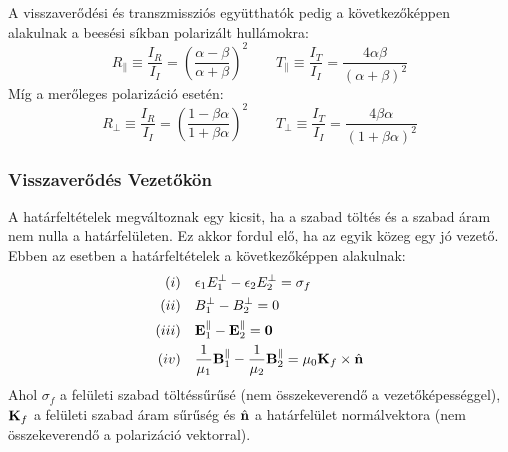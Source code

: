 \documentclass[a4paper,12pt]{article}
\begin{document}
A visszaverődési és transzmissziós együtthatók pedig a következőképpen alakulnak a beesési síkban polarizált hullámokra:
\begin{equation}
    R_\parallel \equiv \frac{I_R}{I_I} = \left( \frac{\alpha - \beta}{\alpha + \beta} \right)^2 \qquad T_\parallel \equiv \frac{I_T}{I_I} = \frac{4 \alpha \beta}{(\alpha + \beta)^2}
\end{equation}
Míg a merőleges polarizáció esetén:
\begin{equation}
    R_\perp \equiv \frac{I_R}{I_I} = \left( \frac{1 - \beta \alpha}{1 + \beta \alpha} \right)^2 \qquad T_\perp \equiv \frac{I_T}{I_I} = \frac{4 \beta \alpha}{(1 + \beta \alpha)^2}
\end{equation}

\subsubsection*{Visszaverődés Vezetőkön}
A határfeltételek megváltoznak egy kicsit, ha a szabad töltés és a szabad áram nem nulla a határfelületen. Ez akkor fordul elő, ha az egyik közeg egy jó vezető. Ebben az esetben a határfeltételek a következőképpen alakulnak:
\begin{equation}
    \begin{aligned}
        (i) \quad & \epsilon_1 E_1^{\perp} - \epsilon_2 E_2^{\perp} = \sigma_f \\
        (ii) \quad & B_1^\perp - B_2^\perp = 0 \\
        (iii) \quad & \bold{E}_1^\parallel - \bold{E}_2^\parallel = \bold{0} \\
        (iv) \quad & \frac{1}{\mu_1} \bold{B}_1^\parallel - \frac{1}{\mu_2} \bold{B}_2^\parallel = \mu_0 \bold{K}_f \times \hat{\bold{n}}
    \end{aligned}
\end{equation} 
Ahol $\sigma_f$ a felületi szabad töltéssűrűsé (nem összekeverendő a vezetőképességgel), $\bold{K}_f$ a felületi szabad áram sűrűség és $\hat{\bold{n}}$ a határfelület normálvektora (nem összekeverendő a polarizáció vektorral). 
\end{document}
